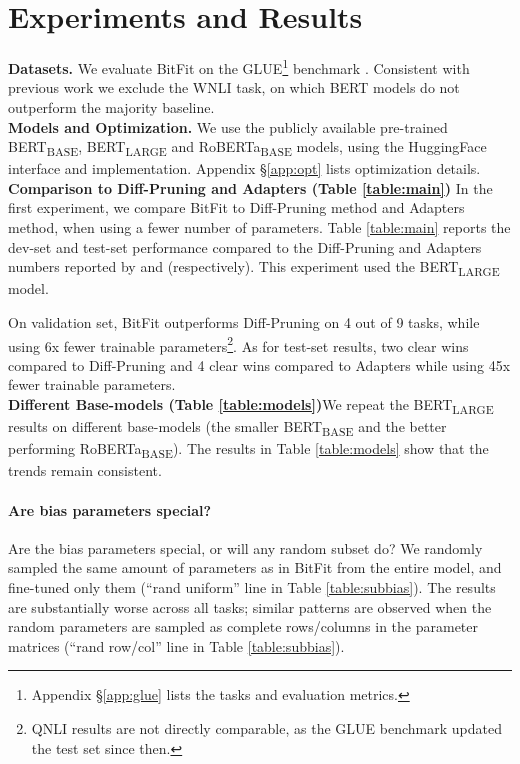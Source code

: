 \section{Experiments and Results}

\textbf{Datasets.}\quad
We evaluate BitFit on the GLUE\footnote{Appendix \S\ref{app:glue} lists the tasks and evaluation metrics.} benchmark \cite{glue}. Consistent with previous work \cite{DBLP:journals/corr/abs-1902-00751,diffp} we exclude the WNLI task, on which BERT models do not outperform the majority baseline.\\

\textbf{Models and Optimization.} We use the publicly available pre-trained BERT\textsubscript{BASE}, BERT\textsubscript{LARGE} \cite{BERT} and RoBERTa\textsubscript{BASE} \cite{ROBERTA} models, using the HuggingFace \cite{huggingface} interface and implementation. Appendix \S\ref{app:opt} lists optimization details. \\

\textbf{Comparison to Diff-Pruning and Adapters (Table \ref{table:main})}\quad
In the first experiment, we compare BitFit to Diff-Pruning method and Adapters method, when using a fewer number of parameters. Table \ref{table:main} reports the dev-set and test-set performance compared to the Diff-Pruning and Adapters numbers reported by \citet{diffp} and \citet{DBLP:journals/corr/abs-1902-00751} (respectively). This experiment used the BERT\textsubscript{LARGE} model.

On validation set, BitFit outperforms Diff-Pruning on 4 out of 9 tasks, while using 6x fewer trainable parameters\footnote{QNLI results are not directly comparable, as the GLUE benchmark updated the test set since then.}. As for test-set results, two clear wins compared to Diff-Pruning and 4 clear wins compared to Adapters while using 45x fewer trainable parameters.\\

\textbf{Different Base-models (Table \ref{table:models})}\quad We repeat the BERT\textsubscript{LARGE} results on different base-models (the smaller BERT\textsubscript{BASE} and the better performing RoBERTa\textsubscript{BASE}). The results in Table \ref{table:models} show that the trends remain consistent.

\paragraph{Are bias parameters special?} Are the bias parameters special, or will any random subset do? We randomly sampled the same amount of parameters as in BitFit from the entire model, and fine-tuned only them (``rand uniform'' line in Table \ref{table:subbias}). The results are substantially worse across all tasks; similar patterns are observed when the random parameters are sampled as complete rows/columns in the parameter matrices (``rand row/col'' line in Table \ref{table:subbias}).

